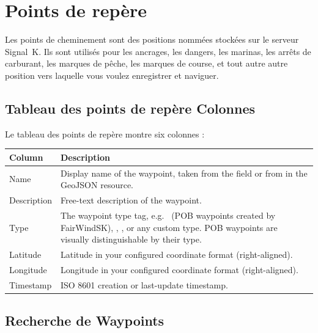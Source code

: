 \chapter{Points de repère}
\label{ch:waypoints}

Les points de cheminement sont des positions nommées stockées sur le serveur Signal~K.
Ils sont utilisés pour les ancrages, les dangers, les marinas, les arrêts de carburant, les marques de pêche, les marques de course, et tout autre
autre position vers laquelle vous voulez enregistrer et naviguer.


\section{Tableau des points de repère Colonnes}

Le tableau des points de repère montre six colonnes :

\begin{longtable}{L{2.4cm} L{11.3cm}}
\toprule
{}
{\sffamily\bfseries\color{white} Column} &
{\sffamily\bfseries\color{white} Description} \\
\midrule
Name & Display name of the waypoint, taken from the  field or from  in the GeoJSON resource. \\
Description & Free-text description of the waypoint. \\
Type & The waypoint type tag, e.g.\  (POB waypoints created by FairWindSK), , , or any custom type. POB waypoints are visually distinguishable by their type. \\
Latitude & Latitude in your configured coordinate format (right-aligned). \\
Longitude & Longitude in your configured coordinate format (right-aligned). \\
Timestamp & ISO 8601 creation or last-update timestamp. \\
\bottomrule
\end{longtable}

\section{Recherche de Waypoints}

